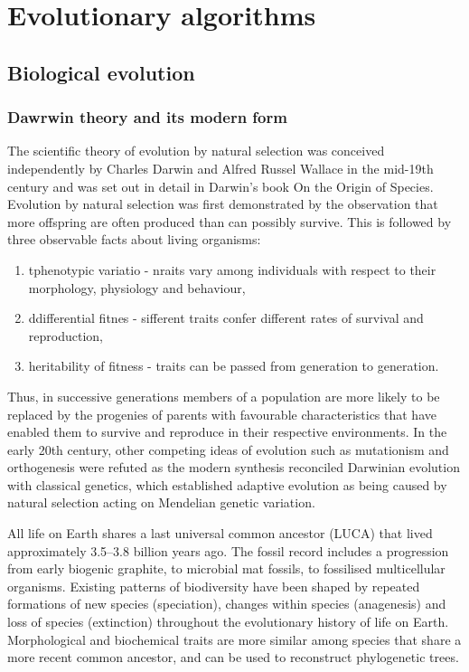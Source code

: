 \chapter{Evolutionary algorithms}


\section{Biological evolution}

\subsection{Dawrwin theory and its modern form}
The scientific theory of evolution by natural selection was conceived independently by
Charles Darwin and Alfred Russel Wallace in the mid-19th century and was set out in detail in
Darwin's book On the Origin of Species.
Evolution by natural selection was first demonstrated by the observation that more offspring are
often produced than can possibly survive. 
This is followed by three observable facts about living organisms:
\begin{enumerate}
	\item  tphenotypic variatio - nraits vary among individuals with respect to their morphology,
		physiology and behaviour, 
	\item ddifferential fitnes - sifferent traits confer different rates of survival 
		and reproduction, 
	\item heritability of fitness - traits can be passed from generation to generation.
\end{enumerate}
Thus, in successive generations members of a population are more likely to be replaced by
the progenies of parents with favourable characteristics that have enabled them to survive and 
reproduce in their respective environments. 
In the early 20th century, other competing ideas of evolution such as mutationism and orthogenesis
were refuted as the modern synthesis reconciled Darwinian evolution with classical genetics,
which established adaptive evolution as being caused by natural selection acting on
Mendelian genetic variation.

All life on Earth shares a last universal common ancestor (LUCA) that lived approximately
3.5–3.8 billion years ago.
The fossil record includes a progression from early biogenic graphite, to microbial mat fossils,
to fossilised multicellular organisms.
Existing patterns of biodiversity have been shaped by repeated formations of new species 
(speciation), changes within species (anagenesis) and loss of species (extinction) throughout the 
evolutionary history of life on Earth.
Morphological and biochemical traits are more similar among species that share a more recent 
common ancestor, and can be used to reconstruct phylogenetic trees.

